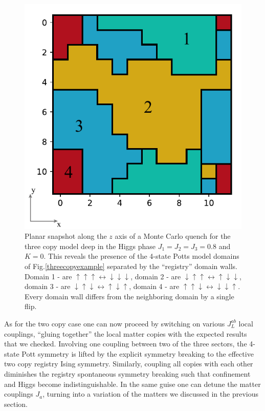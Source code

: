 \begin{figure}[!h]
	\centering
	\includegraphics[scale=1]{figures/chapter2/Z2xZ2xZ2Z2domainWallsSlice.pdf}
	\caption{Planar snapshot along the $z$ axis of a Monte Carlo quench for the three copy model deep in the Higgs phase $J_1=J_2=J_3=0.8$ and $K=0$. This reveals the presence of the 4-state Potts model domains of Fig.\ref{threecopyexample} separated by the ``registry'' domain walls. Domain 1 -  are $\uparrow \uparrow \uparrow \leftrightarrow \downarrow \downarrow \downarrow$, domain 2 -  are $\downarrow \uparrow \uparrow \leftrightarrow \uparrow \downarrow \downarrow$, domain 3 -  are $\downarrow \uparrow \downarrow \leftrightarrow \uparrow \downarrow \uparrow$, domain 4 -  are $\uparrow \uparrow \downarrow \leftrightarrow \downarrow \downarrow \uparrow$. Every domain wall differs from the neighboring domain by a single flip.}
	\label{Z2xZ2xZ2Z2snapshot}
\end{figure}

As for the two copy case one can now proceed by switching on  various $J_L^{ab}$ local couplings, ``gluing together''  the local matter copies with the expected results that we checked. Involving one coupling between two of the three sectors, the 4-state Pott symmetry is lifted by the explicit symmetry breaking to the effective two copy registry Ising symmetry. Similarly, coupling all copies with each other diminishes the registry spontaneous symmetry breaking such that confinement and Higgs become indistinguishable. In the same guise one can detune the matter couplings $J_a$, turning into a variation of the matters we discussed in the previous section. 


